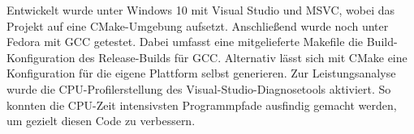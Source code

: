 Entwickelt wurde unter Windows 10 mit Visual Studio und MSVC, wobei das Projekt auf eine CMake-Umgebung aufsetzt. Anschließend wurde noch unter Fedora mit GCC getestet. Dabei umfasst eine mitgelieferte Makefile die Build-Konfiguration des Release-Builds für GCC. Alternativ lässt sich mit CMake eine Konfiguration für die eigene Plattform selbst generieren.
Zur Leistungsanalyse wurde die CPU-Profilerstellung des Visual-Studio-Diagnosetools aktiviert. So konnten die CPU-Zeit intensivsten Programmpfade ausfindig gemacht werden, um gezielt diesen Code zu verbessern.